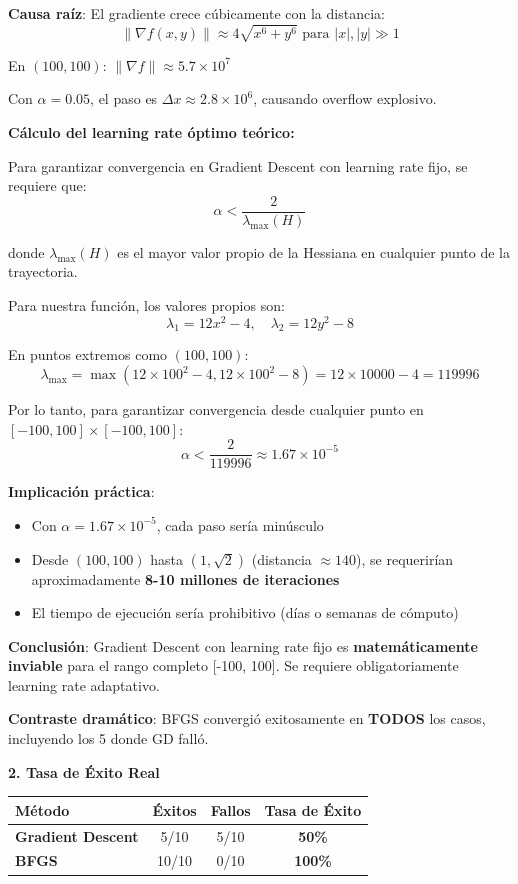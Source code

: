 \documentclass[12pt,a4paper]{article}
\begin{document}
\textbf{Causa raíz}: El gradiente crece cúbicamente con la distancia:
\[\|\nabla f(x,y)\| \approx 4\sqrt{x^6 + y^6} \text{ para } |x|, |y| \gg 1\]

En $(100, 100)$: $\|\nabla f\| \approx 5.7 \times 10^7$

Con $\alpha = 0.05$, el paso es $\Delta x \approx 2.8 \times 10^6$, causando overflow explosivo.

\textbf{Cálculo del learning rate óptimo teórico:}

Para garantizar convergencia en Gradient Descent con learning rate fijo, se requiere que:
\[\alpha < \frac{2}{\lambda_{\max}(H)}\]

donde $\lambda_{\max}(H)$ es el mayor valor propio de la Hessiana en cualquier punto de la trayectoria.

Para nuestra función, los valores propios son:
\[\lambda_1 = 12x^2 - 4, \quad \lambda_2 = 12y^2 - 8\]

En puntos extremos como $(100, 100)$:
\[\lambda_{\max} = \max(12 \times 100^2 - 4, 12 \times 100^2 - 8) = 12 \times 10000 - 4 = 119996\]

Por lo tanto, para garantizar convergencia desde cualquier punto en $[-100, 100] \times [-100, 100]$:
\[\alpha < \frac{2}{119996} \approx 1.67 \times 10^{-5}\]

\textbf{Implicación práctica}:
\begin{itemize}
    \item Con $\alpha = 1.67 \times 10^{-5}$, cada paso sería minúsculo
    \item Desde $(100, 100)$ hasta $(1, \sqrt{2})$ (distancia $\approx 140$), se requerirían aproximadamente \textbf{8-10 millones de iteraciones}
    \item El tiempo de ejecución sería prohibitivo (días o semanas de cómputo)
\end{itemize}

\textbf{Conclusión}: Gradient Descent con learning rate fijo es \textbf{matemáticamente inviable} para el rango completo [-100, 100]. Se requiere obligatoriamente learning rate adaptativo.

\textbf{Contraste dramático}: BFGS convergió exitosamente en \textbf{TODOS} los casos, incluyendo los 5 donde GD falló.

\textbf{2. Tasa de Éxito Real}

\begin{table}[H]
\centering
\begin{tabular}{lccc}
\toprule
\textbf{Método} & \textbf{Éxitos} & \textbf{Fallos} & \textbf{Tasa de Éxito} \\
\midrule
\textbf{Gradient Descent} & 5/10 & 5/10 & \textbf{50\%} \\
\textbf{BFGS} & 10/10 & 0/10 & \textbf{100\%} \\
\bottomrule
\end{tabular}
\end{table}
\end{document}
